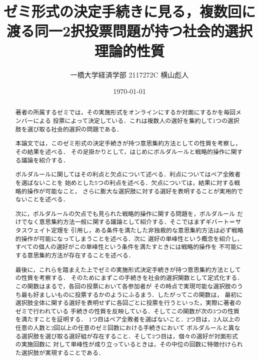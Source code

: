 \documentclass[dvipdfmx]{jsarticle}
\begin{document}
\title{ゼミ形式の決定手続きに見る，複数回に渡る同一2択投票問題が持つ社会的選択理論的性質}
\author{一橋大学経済学部 2117272C 横山彪人}
\date{\today}
\maketitle

\vfill
\begin{abstract}
  著者の所属するゼミでは，その実施形式をオンラインにするか対面にするかを毎回メンバーによる
  投票によって決定している．これは複数人の選好を集約して1つの選択肢を選び取る社会的選択の問題である．
  
  本論文では，このゼミ形式の決定手続きが持つ意思集約方法としての性質を考察し，その結果を述べる．
  その足掛かりとして，はじめにボルダルールと戦略的操作に関する議論を紹介する．
  
  ボルダルールに関してはその利点と欠点について述べる．利点についてはペア全敗者を選ばないことを
  始めとした5つの利点を述べる．欠点については，結果に対する戦略的操作が可能なこと，
  さらに膨大な選択肢に対する選好を表明することが実用的でないことを述べる．
  
  次に，ボルダルールの欠点でも見られた戦略的操作に関する問題を，ボルダルール
  だけでなく意思集約方法一般に関する議論として紹介する．そこではまずギバート＝サタスウェイト定理を
  引用し，ある条件を満たした非独裁的な意思集約方法は必ず戦略的操作が可能になってしまうことを述べる．次に
  選好の単峰性という概念を紹介し，すべての個人の選好がこの単峰性という条件を満たすときには戦略的操作を
  不可能にする意思集約方法が存在することを述べる．
  
  最後に，これらを踏まえた上でゼミの実施形式決定手続きが持つ意思集約方法としての性質を考察する．
  そのためにまずこの手続きを社会的選択関数として定式化する．この関数はまるで，各回の投票において各参加者が
  その時点で実現可能な選択肢のうち最も好ましいものに投票するかのようにふるまう．したがってこの関数は，
  最初に選択肢全体に関する選好を表明せずに各回ごとに投票を行うといった，実際に著者のゼミで行われている
  手続きの性質を反映している．そしてこの関数が次の3つの性質を満たすことを証明する．
  1つ目はペア全敗者を選ばないこと．2つ目は，2人以上の任意の人数と2回以上の任意のゼミ回数における手続きにおいて
  ボルダルールと異なる選択肢を選び取る選好組が存在すること．そして3つ目は，個々の選好が対面形式の実施回数に
  対して単峰性が成り立っているときは，その中位の回数に特徴付けられた選択肢が実現することである．
\end{abstract}
\vfill

\newpage
\tableofcontents
\clearpage
\end{document}

